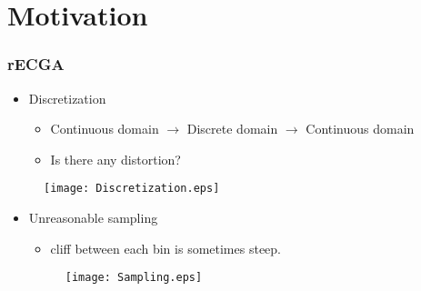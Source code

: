 \section{Motivation}
\begin{frame}
  \frametitle{rECGA}
  \vspace*{-28pt}
  \begin{itemize}
    \item Discretization 
      \begin{itemize}
        \item Continuous domain $\rightarrow$ Discrete domain $\rightarrow$
          Continuous domain
        \item Is there any distortion?
      \end{itemize}
  \end{itemize}
  \vspace*{-23pt}
  \begin{figure}[htpb]
    \flushright
    \texttt{[image: Discretization.eps]}
  \end{figure}
  \vspace*{28pt}
  \begin{itemize}
    \item Unreasonable sampling
      \begin{itemize}
        \item cliff between each bin is sometimes steep.
      \end{itemize}
      \vspace{-14pt}
  \begin{figure}[hpb]
    \texttt{[image: Sampling.eps]}
  \end{figure}
\end{itemize}

\end{frame}


